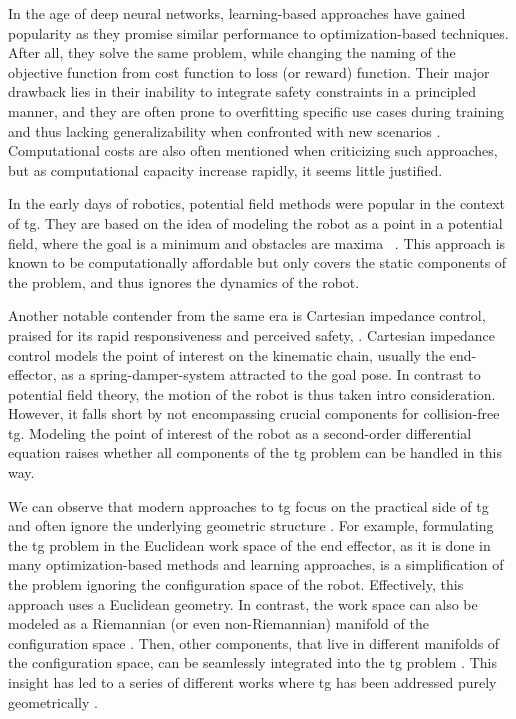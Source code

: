 In the age of deep neural networks, learning-based
approaches have gained popularity as they promise similar
performance to optimization-based techniques. After all,
they solve the same problem, while changing the naming of
the objective function from cost function to loss (or
reward) function. Their major drawback lies in their
inability to integrate safety constraints in a principled
manner, and they are often prone to overfitting specific use cases during
training and thus lacking generalizability when confronted
with new scenarios \cite{noroozi2023conventional}.
Computational costs are also often
mentioned when criticizing such approaches, but as
computational capacity increase rapidly, it seems little
justified. 

In the early days of robotics, potential field methods were
popular in the context of \ac{tg}.
They are based on the idea of modeling the robot as
a point in a potential field, where the goal is a minimum
and obstacles are maxima
~\cite{barraquand1992numerical,hwang1992potential}. This
approach is known to be computationally affordable but
only covers the static components of the problem, and thus
ignores the dynamics of the robot.

Another notable contender from the same era is Cartesian
impedance control, praised for its rapid responsiveness and
perceived safety, \cite{hogan1985impedance}. Cartesian
impedance control models the point of interest on the
kinematic chain, usually the end-effector, as a
spring-damper-system attracted to the goal pose. In contrast
to potential field theory, the motion of the robot is thus
taken intro consideration. However, it falls short by not
encompassing crucial components for collision-free
\ac{tg}. Modeling the point of interest of the robot as a
second-order differential equation raises whether all components of the \ac{tg} problem can be handled
in this way. 

We can observe that modern approaches to \ac{tg} focus on
the practical side of \ac{tg} and often ignore the
underlying geometric structure \cite{Ratliff2015}. For
example, formulating the \ac{tg} problem in the Euclidean
work space of the end effector, as it is done in many
optimization-based methods and learning approaches, is a
simplification of the problem ignoring the configuration
space of the robot. Effectively, this approach uses a
Euclidean geometry. In contrast, the work space can also be
modeled as a Riemannian (or even non-Riemannian) manifold of
the configuration space \cite{klein2023design}. Then, other
components, that live in different manifolds of the
configuration space, can be seamlessly integrated into the
\ac{tg} problem \cite{Ratliff2015}. This insight has led to
a series of different works where \ac{tg} has been addressed
purely geometrically
\cite{Ratliff2015,Cheng2019,Cheng2020,Ratliff2020,Xie2020}.

